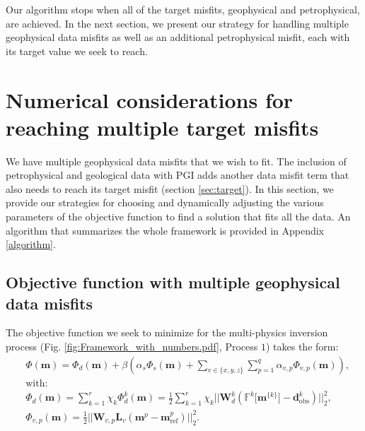 \documentclass[extra, mreferee]{gji_joint} %
\begin{document}
Our algorithm stops when all of the target misfits, geophysical and petrophysical, are achieved. In the next section, we present our strategy for handling multiple geophysical data misfits as well as an additional petrophysical misfit, each with its target value we seek to reach.

\section{Numerical considerations for reaching multiple target misfits}\label{section:Implementation}

We have multiple geophysical data misfits that we wish to fit. The inclusion of petrophysical and geological data with PGI adds another data misfit term that also needs to reach its target misfit (section \ref{sec:target}). In this section, we provide our strategies for choosing and dynamically adjusting the various parameters of the objective function to find a solution that fits all the data. An algorithm that summarizes the whole framework is provided in Appendix \ref{algorithm}.

\subsection{Objective function with multiple geophysical data misfits}

The objective function we seek to minimize for the multi-physics inversion process (Fig. \ref{fig:Framework_with_numbers.pdf}, Process $1$) takes the form:
\begin{align}
&\Phi(\mathbf{m}) = \Phi_d(\mathbf{m}) + \beta \left( \alpha_s \Phi_s(\mathbf{m}) + \sum_{v\in{\{x, y, z\}}}\sum_{p=1}^q\alpha_{v, p}{\Phi_{v, p}(\mathbf{m})}\right) \label{fullobjfct},\\
&\text{with: } \nonumber \\
&\Phi_d(\mathbf{m}) = \sum_{k=1}^r \chi_k \Phi_d^k(\mathbf{m}) = \frac{1}{2} \sum_{k=1}^r \chi_k ||\mathbf{W}_{d}^k(\mathbb{F}^k\lbrack\mathbf{m}^{\{k\}}\rbrack-\mathbf{d}_{\text{obs}}^k)||^2_2, \label{eq:datamisfit} \\
&\Phi_{v, p}(\mathbf{m}) = \frac{1}{2}||\mathbf{W}_{v,p}\mathbf{L}_v(\mathbf{m}^p-\mathbf{m}^p_{\text{ref}})||_2^2 \label{eq:smoothnessip}.
\end{align}
\end{document}
